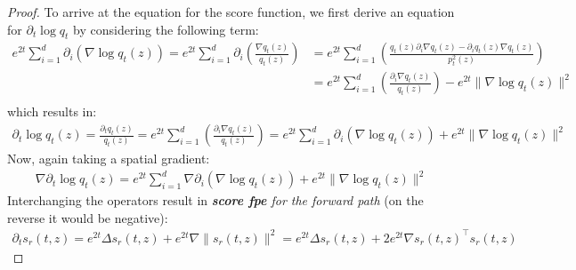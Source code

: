 \documentclass{article}
\begin{document}
\begin{proof}
    \noindent
To arrive at the equation for the score function, we first derive an equation for $\partial_t \log q_t$ by considering the following term:
\begin{align*}
     e^{2t}\sum_{i=1}^d \partial_i \left(\nabla \log q_t(z)\right) = e^{2t}\sum_{i=1}^d \partial_i \left(\frac{\nabla q_t(z)}{q_t(z)} \right) &= e^{2t}\sum_{i=1}^d  \left(\frac{q_t(z)\partial_i\nabla q_t(z)- \partial_i q_t(z)\nabla q_t(z)}{p^2_t(z)} \right) \\
     &= e^{2t}\sum_{i=1}^d  \left(\frac{\partial_i\nabla q_t(z)}{q_t(z)} \right) - e^{2t}\|\nabla\log q_t(z)\|^2  \\
\end{align*}
which results in:
\begin{align*}
  \partial_t \log q_t(z) =  \frac{\partial_tq_t(z)}{q_t(z)} = e^{2t}\sum_{i=1}^d  \left(\frac{\partial_i\nabla q_t(z)}{q_t(z)} \right) = e^{2t}\sum_{i=1}^d \partial_i \left(\nabla \log q_t(z)\right) + e^{2t} \|\nabla\log q_t(z)\|^2
\end{align*}
Now, again taking a spatial gradient:
\begin{align*}
    \nabla\partial_t \log q_t(z) = e^{2t}\sum_{i=1}^d \nabla\partial_i \left(\nabla \log q_t(z)\right) + e^{2t}\|\nabla\log q_t(z)\|^2
\end{align*}
Interchanging the operators result in \textit{\textbf{score fpe} for the forward path} (on the reverse it would be negative):
\begin{align*}
    \partial_t s_r(t,z) = e^{2t} \Delta s_r(t,z) + e^{2t}\nabla \|s_r(t,z)\|^2 = e^{2t} \Delta s_r(t,z) + 2e^{2t}\nabla s_r(t,z)^\top s_r(t,z)
\end{align*}
\end{proof}
\end{document}
